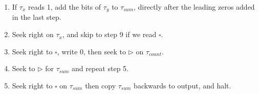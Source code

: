 \documentclass[12pt]{article}
\begin{document}
\begin{enumerate}
{\begin{enumerate}
\item{If $\tau_x$ reads 1, add the bits of $\tau_y$ to $\tau_{sum}$, directly after the leading zeros added in the last step.}
\item{Seek right on $\tau_x$, and skip to step 9 if we read $\square$.}
\item{Seek right to $\square$, write 0, then seek to $\triangleright$ on $\tau_{count}$.}
\item{Seek to $\triangleright$ for $\tau_{sum}$ and repeat step 5.}
\item{Seek right to $\square$ on $\tau_{sum}$ then copy $\tau_{sum}$ backwards to output, and halt.}
\end{enumerate}
}
\end{enumerate}
\end{document}
